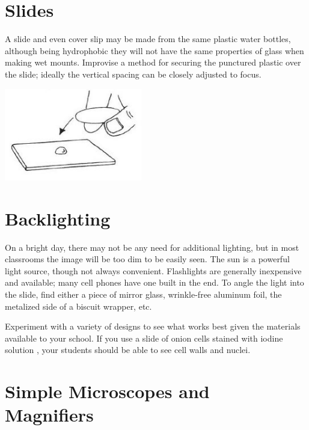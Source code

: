 \begin{multicols}{2}
\columnbreak

\section{Slides} 
A slide and even cover slip may be made from the same plastic water bottles, although being hydrophobic they will not have the same properties of glass when making wet mounts. Improvise a method for securing the punctured plastic over the slide; ideally the vertical spacing can be closely adjusted to focus.
\begin{center}
\includegraphics[width=0.45\textwidth]{./img/vso/slide-cover-slip.jpg}
\end{center}

\section{Backlighting}
On a bright day, there may not be any need for additional lighting, but in most classrooms the image will be too dim to be easily seen. The sun is a powerful light source, though not always convenient. Flashlights are generally inexpensive and available; many cell phones have one built in the end. To angle the light into the slide, find either a piece of mirror glass, wrinkle-free aluminum foil, the metalized side of a biscuit wrapper, etc.

Experiment with a variety of designs to see what works best given the materials available to your school. If you use a slide of onion cells stained with iodine solution
, your students should be able to see cell walls and nuclei.

\vfill
\columnbreak

\section[Simple Microscopes and Magnifiers]{Simple Microscopes and \hfill \\ Magnifiers}


\end{multicols}
